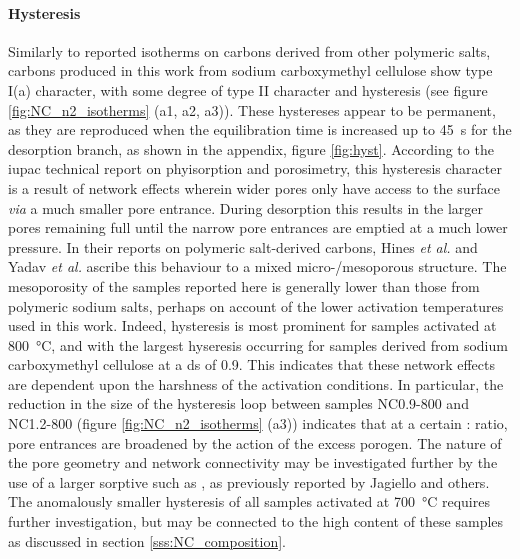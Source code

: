 \paragraph{Hysteresis} Similarly to reported  isotherms on carbons derived from other polymeric salts,\citep{Roberts2015Hierarchically, Yadav20123D, Puthusseri20143D, Hines2004Surface} carbons produced in this work from sodium carboxymethyl cellulose show type I(a) character, with some degree of type II character and hysteresis (see figure \ref{fig:NC_n2_isotherms} (a1, a2, a3)). These hystereses appear to be permanent, as they are reproduced when the equilibration time is increased up to \qty{45}{\second} for the desorption branch, as shown in the appendix, figure \ref{fig:hyst}. According to the \acrshort{iupac} technical report on phyisorption and porosimetry, this hysteresis character is a result of network effects wherein wider pores only have access to the surface \textit{via} a much smaller pore entrance. During desorption this results in the larger pores remaining full until the narrow pore entrances are emptied at a much lower pressure.\citep{Thommes2015Physisorption} In their reports on polymeric salt-derived carbons, Hines \textit{et al.} and Yadav \textit{et al.} ascribe this behaviour to a mixed micro-/mesoporous structure.\citep{Yadav20123D, Hines2004Surface} The mesoporosity of the samples reported here is generally lower than those from polymeric sodium salts,\citep{Roberts2015Hierarchically, Yadav20123D} perhaps on account of the lower activation temperatures used in this work. Indeed, hysteresis is most prominent for samples activated at \qty{800}{\degreeCelsius}, and with the largest hyseresis occurring for samples derived from sodium carboxymethyl cellulose at a \acrshort{ds} of 0.9. This indicates that these network effects are dependent upon the harshness of the activation conditions. In particular, the reduction in the size of the hysteresis loop between samples NC0.9-800 and NC1.2-800 (figure \ref{fig:NC_n2_isotherms} (a3)) indicates that at a certain : ratio, pore entrances are broadened by the action of the excess \gls{porogen}. The nature of the pore geometry and network connectivity may be investigated further by the use of a larger sorptive such as , as previously reported by Jagiello and others.\citep{LopezRamon1997Determination, Jagiello1995Adsorption, Navarro2006} The anomalously smaller hysteresis of all samples activated at \qty{700}{\degreeCelsius} requires further investigation, but may be connected to the high  content of these samples as discussed in section \ref{sss:NC_composition}. 

